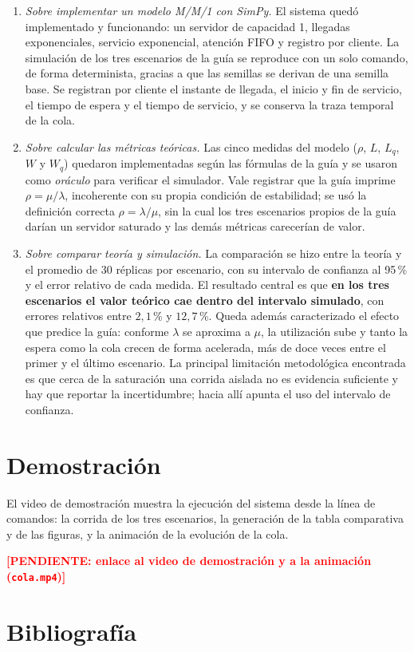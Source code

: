 \documentclass[11pt,a4paper]{article}
\newcommand{\pendiente}[1]{\textcolor{red}{\textbf{[PENDIENTE: #1]}}}
\begin{document}
\begin{enumerate}
    \item \emph{Sobre implementar un modelo M/M/1 con SimPy.} El sistema quedó
    implementado y funcionando: un servidor de capacidad 1, llegadas exponenciales,
    servicio exponencial, atención FIFO y registro por cliente. La simulación de los tres
    escenarios de la guía se reproduce con un solo comando, de forma determinista, gracias
    a que las semillas se derivan de una semilla base. Se registran por cliente el instante
    de llegada, el inicio y fin de servicio, el tiempo de espera y el tiempo de servicio,
    y se conserva la traza temporal de la cola.

    \item \emph{Sobre calcular las métricas teóricas.} Las cinco medidas del modelo
    ($\rho$, $L$, $L_q$, $W$ y $W_q$) quedaron implementadas según las fórmulas de la guía
    y se usaron como \emph{oráculo} para verificar el simulador. Vale registrar que la
    guía imprime $\rho = \mu/\lambda$, incoherente con su propia condición de estabilidad;
    se usó la definición correcta $\rho = \lambda/\mu$, sin la cual los tres escenarios
    propios de la guía darían un servidor saturado y las demás métricas carecerían de
    valor.

    \item \emph{Sobre comparar teoría y simulación.} La comparación se hizo entre la
    teoría y el promedio de 30 réplicas por escenario, con su intervalo de confianza al
    95\,\% y el error relativo de cada medida. El resultado central es que \textbf{en los
    tres escenarios el valor teórico cae dentro del intervalo simulado}, con errores
    relativos entre $2{,}1$\,\% y $12{,}7$\,\%. Queda además caracterizado el efecto que
    predice la guía: conforme $\lambda$ se aproxima a $\mu$, la utilización sube y tanto
    la espera como la cola crecen de forma acelerada, más de doce veces entre el primer y
    el último escenario. La principal limitación metodológica encontrada es que cerca de
    la saturación una corrida aislada no es evidencia suficiente y hay que reportar la
    incertidumbre; hacia allí apunta el uso del intervalo de confianza.
\end{enumerate}

\section{Demostración}

El video de demostración muestra la ejecución del sistema desde la línea de comandos:
la corrida de los tres escenarios, la generación de la tabla comparativa y de las
figuras, y la animación de la evolución de la cola.

\pendiente{enlace al video de demostración y a la animación
(\texttt{cola.mp4})}

\section{Bibliografía}

\nocite{*}


\end{document}
